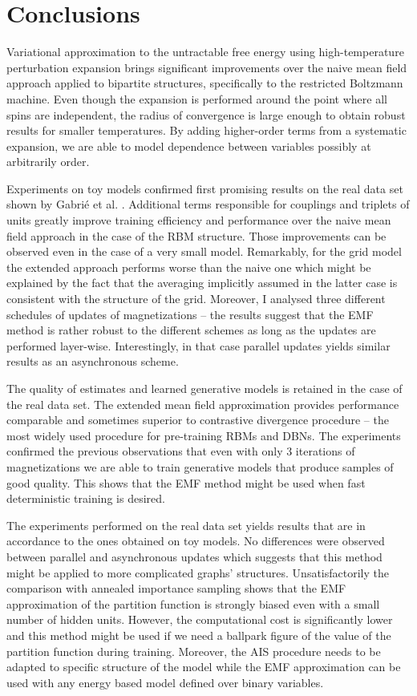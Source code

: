 \chapter*{Conclusions}
Variational approximation to the untractable free energy using high-temperature perturbation expansion brings significant improvements over the naive mean field approach applied to bipartite structures, specifically to the restricted Boltzmann machine. Even though the expansion is performed around the point where all spins are independent, the radius of convergence is large enough to obtain robust results for smaller temperatures. By adding higher-order terms from a systematic expansion, we are able to model dependence between variables possibly at arbitrarily order.

Experiments on toy models confirmed first promising results on the real data set shown by Gabri{\'e} et al. \cite{gabrie2015training}. Additional terms responsible for couplings and triplets of units greatly improve training efficiency and performance over the naive mean field approach in the case of the RBM structure. Those improvements can be observed even in the case of a very small model. Remarkably, for the grid model the extended approach performs worse than the naive one which might be explained by the fact that the averaging implicitly assumed in the latter case is consistent with the structure of the grid. Moreover, I analysed three different schedules of updates of magnetizations -- the results suggest that the EMF method is rather robust to the different schemes as long as the updates are performed layer-wise. Interestingly, in that case parallel updates yields similar results as an asynchronous scheme.

The quality of estimates and learned generative models is retained in the case of the real data set. The extended mean field approximation provides performance comparable and sometimes superior to contrastive divergence procedure -- the most widely used procedure for pre-training RBMs and DBNs. The experiments confirmed the previous observations that even with only $3$ iterations of magnetizations we are able to train generative models that produce samples of good quality. This shows that the EMF method might be used when fast deterministic training is desired.

The experiments performed on the real data set yields results that are in accordance to the ones obtained on toy models. No differences were observed between parallel and asynchronous updates which suggests that this method might be applied to more complicated graphs' structures. Unsatisfactorily the comparison with annealed importance sampling shows that the EMF approximation of the partition function is strongly biased even with a small number of hidden units. However, the computational cost is significantly lower and  this method might be used if we need a ballpark figure of the value of the partition function during training. Moreover, the AIS procedure needs to be adapted to specific structure of the model while the EMF approximation can be used with any energy based model defined over binary variables.

